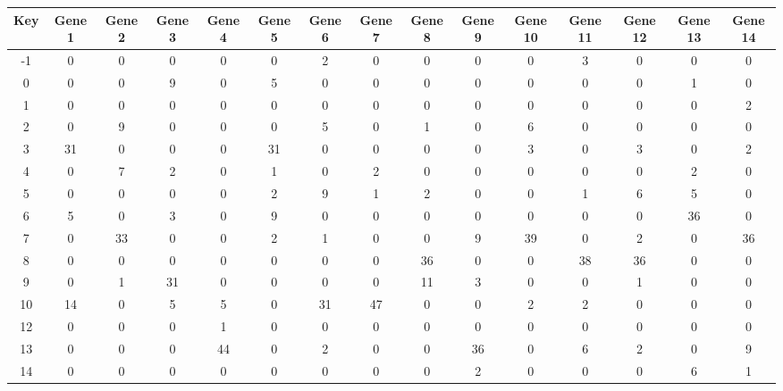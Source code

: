 \begin{tabular}{|c|c|c|c|c|c|c|c|c|c|c|c|c|c|c|}
\hline
Key & Gene 1 & Gene 2 & Gene 3 & Gene 4 & Gene 5 & Gene 6 & Gene 7 & Gene 8 & Gene 9 & Gene 10 & Gene 11 & Gene 12 & Gene 13 & Gene 14 \\
\hline
-1 & 0 & 0 & 0 & 0 & 0 & 2 & 0 & 0 & 0 & 0 & 3 & 0 & 0 & 0 \\
0 & 0 & 0 & 9 & 0 & 5 & 0 & 0 & 0 & 0 & 0 & 0 & 0 & 1 & 0 \\
1 & 0 & 0 & 0 & 0 & 0 & 0 & 0 & 0 & 0 & 0 & 0 & 0 & 0 & 2 \\
2 & 0 & 9 & 0 & 0 & 0 & 5 & 0 & 1 & 0 & 6 & 0 & 0 & 0 & 0 \\
3 & 31 & 0 & 0 & 0 & 31 & 0 & 0 & 0 & 0 & 3 & 0 & 3 & 0 & 2 \\
4 & 0 & 7 & 2 & 0 & 1 & 0 & 2 & 0 & 0 & 0 & 0 & 0 & 2 & 0 \\
5 & 0 & 0 & 0 & 0 & 2 & 9 & 1 & 2 & 0 & 0 & 1 & 6 & 5 & 0 \\
6 & 5 & 0 & 3 & 0 & 9 & 0 & 0 & 0 & 0 & 0 & 0 & 0 & 36 & 0 \\
7 & 0 & 33 & 0 & 0 & 2 & 1 & 0 & 0 & 9 & 39 & 0 & 2 & 0 & 36 \\
8 & 0 & 0 & 0 & 0 & 0 & 0 & 0 & 36 & 0 & 0 & 38 & 36 & 0 & 0 \\
9 & 0 & 1 & 31 & 0 & 0 & 0 & 0 & 11 & 3 & 0 & 0 & 1 & 0 & 0 \\
10 & 14 & 0 & 5 & 5 & 0 & 31 & 47 & 0 & 0 & 2 & 2 & 0 & 0 & 0 \\
12 & 0 & 0 & 0 & 1 & 0 & 0 & 0 & 0 & 0 & 0 & 0 & 0 & 0 & 0 \\
13 & 0 & 0 & 0 & 44 & 0 & 2 & 0 & 0 & 36 & 0 & 6 & 2 & 0 & 9 \\
14 & 0 & 0 & 0 & 0 & 0 & 0 & 0 & 0 & 2 & 0 & 0 & 0 & 6 & 1 \\
\hline
\end{tabular}